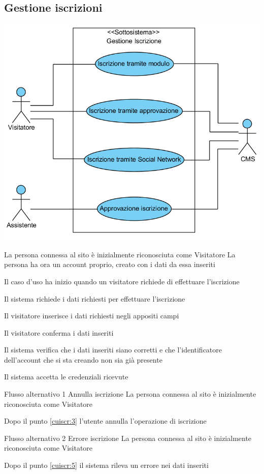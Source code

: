 \subsection{Gestione iscrizioni}
\begin{center}
   \includegraphics[width=\textwidth]{assets/visualParadigm/GestioneIscrizione}
\end{center}
{}
{La persona connessa al sito è inizialmente riconosciuta come Visitatore}
{La persona ha ora un account proprio, creato con i dati da essa inseriti}
{\begin{enumCU}
	\item Il caso d'uso ha inizio quando un visitatore richiede di effettuare l'iscrizione
	\item Il sistema richiede i dati richiesti per effettuare l'iscrizione
	\item Il visitatore inserisce i dati richiesti negli appositi campi \label{cuiscr:3}
	\item Il visitatore conferma i dati inseriti
	\item Il sistema verifica che i dati inseriti siano corretti e che l'identificatore dell'account che si sta creando non sia già presente \label{cuiscr:5}
	\item Il sistema accetta le credenziali ricevute
\end{enumCU}}
%
{Flusso alternativo 1}%
{Annulla iscrizione}%
{La persona connessa al sito è inizialmente riconosciuta come Visitatore}%
{\postNulle}%
{\begin{enumCU}
		\item Dopo il punto \ref{cuiscr:3} l'utente annulla l'operazione di iscrizione
	\end{enumCU}}%
%
{Flusso alternativo 2}%
{Errore iscrizione}%
{La persona connessa al sito è inizialmente riconosciuta come Visitatore}%
{\postNulle}%
{\begin{enumCU}
		\item Dopo il punto \ref{cuiscr:5} il sistema rileva un errore nei dati inseriti
	\end{enumCU}}%



